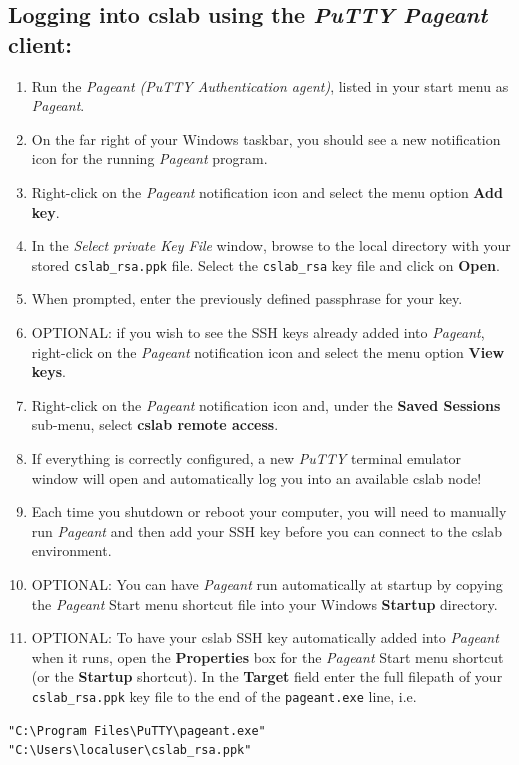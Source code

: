 \documentclass[12pt]{article}
\begin{document}
\begin{flushleft}
\newpage
\subsection*{Logging into cslab using the \textit{PuTTY Pageant} client:}
\begin{enumerate}
  \item Run the \textit{Pageant (PuTTY Authentication agent)}, listed in your start menu as \textit{Pageant}.
  \item On the far right of your Windows taskbar, you should see a new notification icon for the running \textit{Pageant} program.
  \item Right-click on the \textit{Pageant} notification icon and select the menu option \textbf{Add key}.
  \item In the \textit{Select private Key File} window, browse to the local directory with your stored \verb|cslab_rsa.ppk| file. Select the \texttt{cslab\_rsa} key file and click on \textbf{Open}.
  \item When prompted, enter the previously defined passphrase for your key.
  \item OPTIONAL: if you wish to see the SSH keys already added into \textit{Pageant}, right-click on the \textit{Pageant} notification icon and select the menu option \textbf{View keys}.
  \item Right-click on the \textit{Pageant} notification icon and, under the \textbf{Saved Sessions} sub-menu, select \textbf{cslab remote access}.
  \item If everything is correctly configured, a new \textit{PuTTY} terminal emulator window will open and automatically log you into an available cslab node!
  \item Each time you shutdown or reboot your computer, you will need to manually run \textit{Pageant} and then add your SSH key before you can connect to the cslab environment.
  \item OPTIONAL: You can have \textit{Pageant} run automatically at startup by copying the \textit{Pageant} Start menu shortcut file into your Windows \textbf{Startup} directory.
  \item OPTIONAL: To have your cslab SSH key automatically added into \textit{Pageant} when it runs, open the \textbf{Properties} box for the \textit{Pageant} Start menu shortcut (or the \textbf{Startup} shortcut). In the \textbf{Target} field enter the full filepath of your \verb|cslab_rsa.ppk| key file to the end of the \verb|pageant.exe| line, i.e.
\end{enumerate}
  \begin{verbatim}
"C:\Program Files\PuTTY\pageant.exe" "C:\Users\localuser\cslab_rsa.ppk"
  \end{verbatim}


\end{flushleft}
\end{document}
